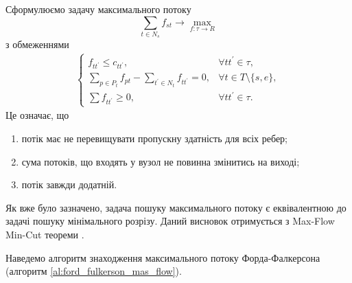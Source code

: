 Сформулюємо задачу максимального потоку
\begin{equation*}
    \sum_{t \in N_s} f_{st} \rightarrow \max_{f: \tau \rightarrow R }
\end{equation*}
з обмеженнями
\begin{equation*}
    \begin{gathered}
        \begin{cases}
            f_{tt^{'}} \leq  c_{tt^{'}},                                   & \forall tt^{'}  \in \tau ,         \\
            \sum_{p \in P_t} f_{pt} - \sum_{t^{'} \in N_t} f_{tt^{'}} = 0, & \forall t \in T \setminus \{s,e\}, \\
            \sum f_{tt^{'}} \geq 0,                                        & \forall tt^{'}  \in \tau.
        \end{cases}
    \end{gathered}
\end{equation*}
Це означає, що
\begin{enumerate}
    \item потік має не перевищувати пропускну здатність для всіх ребер;
    \item сума потоків, що входять у вузол не повинна змінитись на виході;
    \item потік завжди додатній.
\end{enumerate}

Як вже було зазначено,
задача пошуку максимального потоку є еквівалентною до задачі пошуку мінімального розрізу.
Даний висновок отримується з Max-Flow Min-Cut теореми \cite{ford_fulkerson,edmods_karp}.

Наведемо алгоритм знаходження максимального потоку Форда-Фалкерсона (алгоритм \ref{al:ford_fulkerson_mas_flow}).

